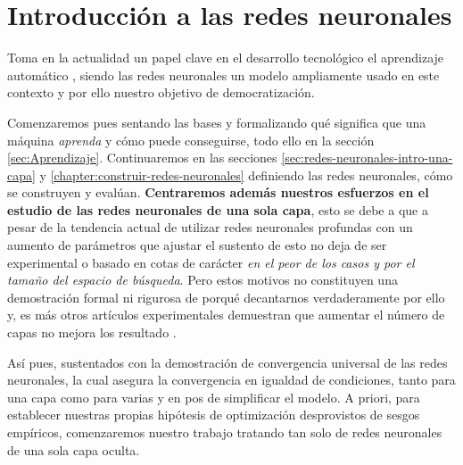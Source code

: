 
\chapter{Introducción a las redes neuronales} 
\label{chapter:Introduction-neuronal-networks}
Toma en la actualidad un papel clave en el desarrollo tecnológico el aprendizaje automático
\cite{importancia-arte-aprendizaje-automatico}, siendo 
las redes neuronales un modelo ampliamente usado en este contexto y por ello 
nuestro objetivo de democratización. 

Comenzaremos pues  sentando las bases y 
formalizando  
qué significa 
que una máquina \textit{aprenda}  y cómo puede conseguirse, 
todo ello en la sección \ref{sec:Aprendizaje}.
Continuaremos en las secciones \ref{sec:redes-neuronales-intro-una-capa} 
y \ref{chapter:construir-redes-neuronales}
definiendo las redes neuronales, cómo se construyen y evalúan. 
\label{motivo-una-capa}
\textbf{Centraremos además nuestros esfuerzos en el estudio de las redes neuronales de una sola capa}, 
esto se debe a que a pesar de la tendencia actual de utilizar redes neuronales profundas con 
un aumento de parámetros que ajustar 
\cite{a-universal-law-of-Robustness} \cite{CHAI2021100134} el sustento de esto no deja de ser experimental 
o basado en cotas de carácter \textit{en el peor de los casos y por el tamaño del espacio de búsqueda}.
Pero estos motivos no constituyen una demostración formal ni rigurosa de porqué decantarnos verdaderamente por 
ello y, es más otros artículos experimentales demuestran que aumentar el número de capas no mejora los resultado 
\cite{DBLP:conf/iwann/Linan-Villafranca21}. 

Así pues, sustentados con la demostración de convergencia universal \cite{HORNIK1989359}
de las redes neuronales, la cual asegura la convergencia en igualdad de condiciones, 
tanto para una capa como para varias
y en pos de simplificar el modelo. 
A priori, 
para establecer nuestras propias hipótesis de optimización desprovistos
de sesgos empíricos, comenzaremos nuestro trabajo tratando tan solo de redes neuronales de una sola capa oculta.